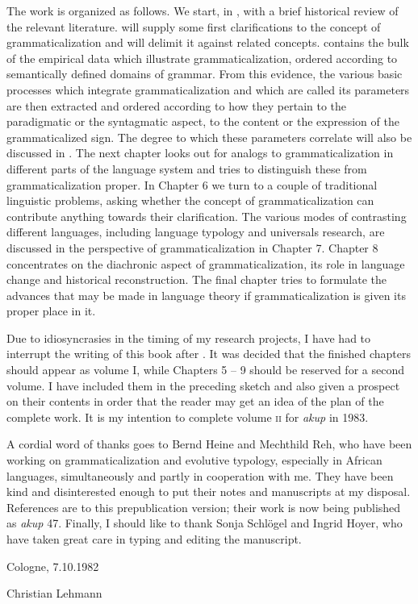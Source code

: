 The work is organized as follows. We start, in , with a brief historical review of the relevant literature.  will supply some first clarifications to the concept of grammaticalization and will delimit it against related concepts.  contains the bulk of the empirical data which illustrate grammaticalization, ordered according to semantically defined domains of grammar. From this evidence, the various basic processes which integrate grammaticalization and which are called its parameters are then extracted and ordered according to how they pertain to the paradigmatic or the syntagmatic aspect, to the content or the expression of the grammaticalized sign. The degree to which these parameters correlate will also be discussed in . The next chapter looks out for analogs to grammaticalization in different parts of the language system and tries to distinguish these from grammaticalization proper. In Chapter 6 we turn to a couple of traditional linguistic problems, asking whether the concept of grammaticalization can contribute anything towards their clarification. The various modes of contrasting different languages, including language typology and universals research, are discussed in the perspective of grammaticalization in Chapter 7. Chapter 8 concentrates on the diachronic aspect of grammaticalization, its role in language change and historical reconstruction. The final chapter tries to formulate the advances that may be made in language theory if grammaticalization is given its proper place in it.

Due to idiosyncrasies in the timing of my research projects, I have had to interrupt the writing of this book after . It was decided that the finished chapters should appear as volume I, while Chapters 5 -- 9 should be reserved for a second volume. I have included them in the preceding sketch and also given a prospect on their contents in order that the reader may get an idea of the plan of the complete work. It is my intention to complete volume \textsc{ii} for \textit{akup} in 1983.

A cordial word of thanks goes to Bernd Heine and Mechthild Reh, who have been working on grammaticalization and evolutive typology, especially in African languages, simultaneously and partly in cooperation with me. They have been kind and disinterested enough to put their notes and manuscripts at my disposal. References are to this prepublication version; their work is now being published as \textit{akup} 47. Finally, I should like to thank Sonja Schlögel and Ingrid Hoyer, who have taken great care in typing and editing the manuscript.\enlargethispage{2\baselineskip}

\vspace{\baselineskip}

\begin{minipage}{.5\linewidth}
\begin{flushleft}
Cologne, 7.10.1982
\end{flushleft}
\end{minipage}
\begin{minipage}{.45\linewidth}
\begin{flushright}
Christian Lehmann
\end{flushright}
\end{minipage}